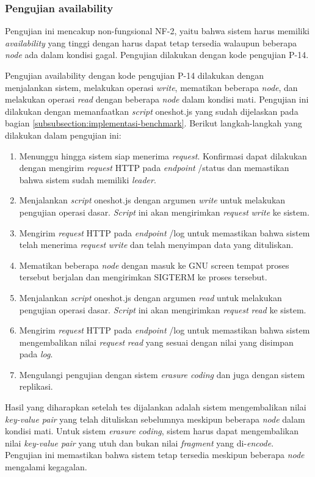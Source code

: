 \subsubsection{Pengujian availability}
\label{subsubsection:pengujian-availability}

Pengujian ini mencakup non-fungsional NF-2, yaitu bahwa sistem harus memiliki \textit{availability} yang tinggi dengan harus dapat tetap tersedia walaupun beberapa \textit{node} ada dalam kondisi gagal. Pengujian dilakukan dengan kode pengujian P-14.


Pengujian availability dengan kode pengujian P-14 dilakukan dengan menjalankan sistem, melakukan operasi \textit{write}, mematikan beberapa \textit{node}, dan melakukan operasi \textit{read} dengan beberapa \textit{node} dalam kondisi mati. Pengujian ini dilakukan dengan memanfaatkan \textit{script} oneshot.js yang sudah dijelaskan pada bagian \ref{subsubsection:implementasi-benchmark}. Berikut langkah-langkah yang dilakukan dalam pengujian ini:

\begin{enumerate}
    \item Menunggu hingga sistem siap menerima \textit{request}. Konfirmasi dapat dilakukan dengan mengirim \textit{request} HTTP pada \textit{endpoint} /status dan memastikan bahwa sistem sudah memiliki \textit{leader}.
    \item Menjalankan \textit{script} oneshot.js dengan argumen \textit{write} untuk melakukan pengujian operasi dasar. \textit{Script} ini akan mengirimkan \textit{request} \textit{write} ke sistem.
    \item Mengirim \textit{request} HTTP pada \textit{endpoint} /log untuk memastikan bahwa sistem telah menerima \textit{request} \textit{write} dan telah menyimpan data yang dituliskan.
    \item Mematikan beberapa \textit{node} dengan masuk ke GNU screen tempat proses tersebut berjalan dan mengirimkan SIGTERM ke proses tersebut.
    \item Menjalankan \textit{script} oneshot.js dengan argumen \textit{read} untuk melakukan pengujian operasi dasar. \textit{Script} ini akan mengirimkan \textit{request} \textit{read} ke sistem.
    \item Mengirim \textit{request} HTTP pada \textit{endpoint} /log untuk memastikan bahwa sistem mengembalikan nilai \textit{request} \textit{read} yang sesuai dengan nilai yang disimpan pada \textit{log}.
    \item Mengulangi pengujian dengan sistem \textit{erasure coding} dan juga dengan sistem replikasi.
\end{enumerate}

Hasil yang diharapkan setelah tes dijalankan adalah sistem mengembalikan nilai \textit{key-value pair} yang telah dituliskan sebelumnya meskipun beberapa \textit{node} dalam kondisi mati. Untuk sistem \textit{erasure coding}, sistem harus dapat mengembalikan nilai \textit{key-value pair} yang utuh dan bukan nilai \textit{fragment} yang di-\textit{encode}. Pengujian ini memastikan bahwa sistem tetap tersedia meskipun beberapa \textit{node} mengalami kegagalan.